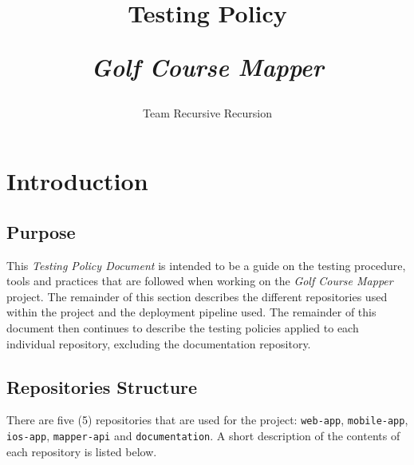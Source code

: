 \documentclass{article}
\title{
    Testing Policy\\
    \begin{large}
        \textit{Golf Course Mapper}
    \end{large}
}
\date{
    \begin{small}
        \today
    \end{small}
}
\author{
    Team Recursive Recursion
}
\begin{document}
    \maketitle
    \newpage
    
    \tableofcontents
    \newpage


    \section{Introduction}
    \label{sec:intro}

    \subsection{Purpose}
    \label{sec:purp}

    This \textit{Testing Policy Document} is intended to be a guide on the
    testing procedure, tools and practices that are followed when working on
    the \textit{Golf Course Mapper} project. The remainder of this section
    describes the different repositories used within the project and the
    deployment pipeline used. The remainder of this document then continues to
    describe the testing policies applied to each individual repository,
    excluding the documentation repository.

    \subsection{Repositories Structure}
    \label{sec:reps}

    There are five (5) repositories that are used for the project:
    \texttt{web-app}, \texttt{mobile-app}, \texttt{ios-app},
    \texttt{mapper-api} and \texttt{documentation}. A short description of the
    contents of each repository is listed below.
\end{document}
